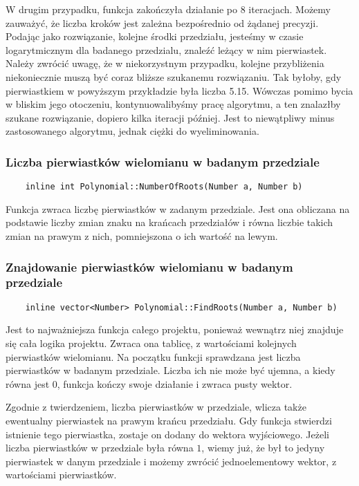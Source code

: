 \documentclass[oneside,a4paper]{book}
\begin{document}
	W drugim przypadku, funkcja zakończyła działanie po 8 iteracjach. Możemy zauważyć, że liczba kroków jest zależna bezpośrednio od żądanej precyzji. Podając jako rozwiązanie, kolejne środki przedziału, jesteśmy w czasie logarytmicznym dla badanego przedzialu, znaleźć leżący w nim pierwiastek. Należy zwrócić uwagę, że w niekorzystnym przypadku, kolejne przybliżenia niekoniecznie muszą być coraz bliższe szukanemu rozwiązaniu. Tak byłoby, gdy pierwiastkiem w powyższym przykładzie była liczba 5.15. Wówczas pomimo bycia w bliskim jego otoczeniu, kontynuowalibyśmy pracę algorytmu, a ten znalazłby szukane rozwiązanie, dopiero kilka iteracji później. Jest to niewątpliwy minus zastosowanego algorytmu, jednak ciężki do wyeliminowania.
	
	\subsubsection{Liczba pierwiastków wielomianu w badanym przedziale}
	\begin{lstlisting}
	inline int Polynomial::NumberOfRoots(Number a, Number b)
	\end{lstlisting}
	
	Funkcja zwraca liczbę pierwiastków w zadanym przedziale. Jest ona obliczana na podstawie liczby zmian znaku na krańcach przedziałów i równa liczbie takich zmian na prawym z nich, pomniejszona o ich wartość na lewym.
	
	\subsubsection{Znajdowanie pierwiastków wielomianu w badanym przedziale}
	\begin{lstlisting}
	inline vector<Number> Polynomial::FindRoots(Number a, Number b)
	\end{lstlisting}
	
	Jest to najważniejsza funkcja całego projektu, ponieważ wewnątrz niej znajduje się cała logika projektu. Zwraca ona tablicę, z wartościami kolejnych pierwiastków wielomianu. Na początku funkcji sprawdzana jest liczba pierwiastków w badanym przedziale. Liczba ich nie może być ujemna, a kiedy równa jest $0$, funkcja kończy swoje działanie i zwraca pusty wektor.
	
	Zgodnie z twierdzeniem, liczba pierwiastków w przedziale, wlicza także ewentualny pierwiastek na prawym krańcu przedziału. Gdy funkcja stwierdzi istnienie tego pierwiastka, zostaje on dodany do wektora wyjściowego. Jeżeli liczba pierwiastków w przedziale była równa $1$, wiemy już, że był to jedyny pierwiastek w danym przedziale i możemy zwrócić jednoelementowy wektor, z wartościami pierwiastków.
	
\end{document}
